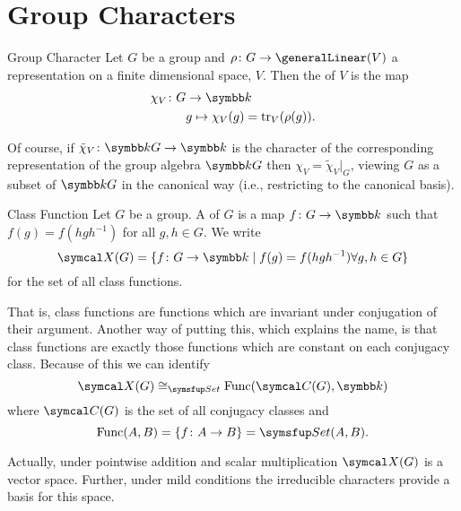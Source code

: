 \section{Group Characters}
\begin{dfn}{Group Character}{}
    Let \(G\) be a group and \(\rho \colon G \to \generalLinear(V)\) a representation on a finite dimensional space, \(V\).
    Then the  of \(V\) is the map
    \begin{align}
        \chi_V \colon G &\to \field\\
        & g \mapsto \chi_V(g) = \tr_V(\rho(g)).
    \end{align}
\end{dfn}
Of course, if \(\tilde{\chi}_V \colon \field G \to \field\) is the character of the corresponding representation of the group algebra \(\field G\) then \(\chi_V = \tilde{\chi}_V|_G\), viewing \(G\) as a subset of \(\field G\) in the canonical way (i.e., restricting to the canonical basis).

\begin{dfn}{Class Function}{}
    Let \(G\) be a group.
    A  of \(G\) is a map \(f \colon G \to \field\) such that \(f(g) = f(hgh^{-1})\) for all \(g, h \in G\).
    We write
    \begin{equation}
        \classFunctions(G) = \{f \colon G \to \field \mid f(g) = f(hgh^{-1}) \forall g, h \in G\}
    \end{equation}
    for the set of all class functions.
\end{dfn}

That is, class functions are functions which are invariant under conjugation of their argument.
Another way of putting this, which explains the name, is that class functions are exactly those functions which are constant on each conjugacy class.
Because of this we can identify
\begin{equation}
    \classFunctions(G) \isomorphic_{\Set} \Func(\conjugacyClasses(G), \field)
\end{equation}
where \(\conjugacyClasses(G)\) is the set of all conjugacy classes and
\begin{equation}
    \Func(A, B) = \{f \colon A \to B\} = \Set(A, B).
\end{equation}

Actually, under pointwise addition and scalar multiplication \(\classFunctions(G)\) is a vector space.
Further, under mild conditions the irreducible characters provide a basis for this space.


